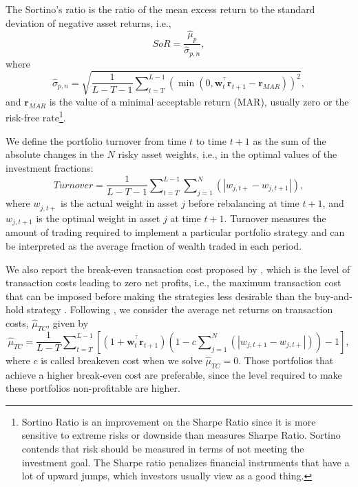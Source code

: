 \documentclass[a4paper,10pt]{article}
\begin{document}
The Sortino's ratio \citep*{sortino1994} is the ratio of the mean excess return to the standard deviation of negative asset returns, i.e.,
\begin{equation}
SoR=\frac{\widehat{\mu }_{p}}{\widehat{\sigma }_{p,n}},
\end{equation}%
where
\begin{equation}
\widehat{\sigma }_{p,n}=\sqrt{\frac{1}{L-T-1}\sum\nolimits_{t=T}^{L-1}\left(
	\min \left( 0,\mathbf{w}_{t}^{^{\top }}\mathbf{r}_{t+1}-\mathbf{r}%
	_{MAR}\right) \right) ^{2}},
\end{equation}%
and $\mathbf{r}_{MAR}$ is the value of a minimal acceptable return (MAR), usually zero or the risk-free rate\footnote{Sortino Ratio is an improvement on the Sharpe Ratio since it is more sensitive to extreme risks or downside than measures Sharpe Ratio. Sortino contends that risk should be measured in terms of not meeting the investment goal. The Sharpe ratio penalizes financial instruments that have a lot of upward jumps, which investors usually view as a good thing.}.

We define the portfolio turnover from time $t$ to time $t+1$ as the sum of the absolute changes in the $N$ risky asset weights, i.e., in the optimal values of the investment fractions:
\begin{equation}
Turnover=\frac{1}{L-T-1}\sum\nolimits_{t=T}^{L-1}\sum\nolimits_{j=1}^{N}%
\left( \left\vert w_{j,t+}-w_{j,t+1}\right\vert \right),
\end{equation}%
where $w_{j,t+}^{{}}$ is the actual weight in asset $j$ before rebalancing at time $t+1$, and $w_{j,t+1}$ is the optimal weight in asset $j$ at time $t+1$. Turnover measures the amount of trading required to implement a particular portfolio strategy and can be interpreted as the average fraction of wealth traded in each period. 

We also report the break-even transaction cost proposed by \citet*{bessembinder1995}, which is the level of transaction costs leading to zero net profits, i.e., the maximum transaction cost that can be imposed before making the strategies less desirable than the buy-and-hold strategy \citep[see][]{han2006}. Following \citet*{santos2012}, we consider the average net returns on transaction costs, $\widehat{\mu }_{TC}$, given by
\begin{equation}
\widehat{\mu }_{TC}=\frac{1}{L-T}\sum\nolimits_{t=T}^{L-1}\left[ \left( 1+%
\mathbf{w}_{t}^{^{\top }}\mathbf{r}_{t+1}\right) \left(
1-c\sum\nolimits_{j=1}^{N}\left( \left\vert w_{j,t+1}-w_{j,t+}\right\vert
\right) \right) -1\right] ,
\end{equation}%
where $c$ is called breakeven cost when we solve $\widehat{\mu }_{TC}=0.$ Those portfolios that achieve a higher break-even cost are preferable, since the level required to make these portfolios non-profitable are higher.
\end{document}
